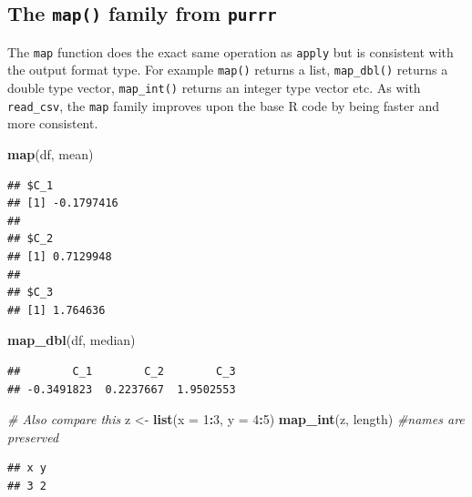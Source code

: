 \documentclass[12pt,]{article}
\newenvironment{Shaded}{\begin{snugshade}}{\end{snugshade}}
\newcommand{\KeywordTok}[1]{\textcolor[rgb]{0.13,0.29,0.53}{\textbf{#1}}}
\newcommand{\DataTypeTok}[1]{\textcolor[rgb]{0.13,0.29,0.53}{#1}}
\newcommand{\DecValTok}[1]{\textcolor[rgb]{0.00,0.00,0.81}{#1}}
\newcommand{\StringTok}[1]{\textcolor[rgb]{0.31,0.60,0.02}{#1}}
\newcommand{\CommentTok}[1]{\textcolor[rgb]{0.56,0.35,0.01}{\textit{#1}}}
\newcommand{\OperatorTok}[1]{\textcolor[rgb]{0.81,0.36,0.00}{\textbf{#1}}}
\newcommand{\NormalTok}[1]{#1}
\begin{document}
\subsection{\texorpdfstring{The \texttt{map()} family from
\texttt{purrr}}{The map() family from purrr}}\label{the-map-family-from-purrr}

The \texttt{map} function does the exact same operation as
\texttt{apply} but is consistent with the output format type. For
example \texttt{map()} returns a list, \texttt{map\_dbl()} returns a
double type vector, \texttt{map\_int()} returns an integer type vector
etc. As with \texttt{read\_csv}, the \texttt{map} family improves upon
the base R code by being faster and more consistent.

\begin{Shaded}
\begin{Highlighting}[]
\KeywordTok{map}\NormalTok{(df, mean)}
\end{Highlighting}
\end{Shaded}

\begin{verbatim}
## $C_1
## [1] -0.1797416
## 
## $C_2
## [1] 0.7129948
## 
## $C_3
## [1] 1.764636
\end{verbatim}

\begin{Shaded}
\begin{Highlighting}[]
\KeywordTok{map_dbl}\NormalTok{(df, median)}
\end{Highlighting}
\end{Shaded}

\begin{verbatim}
##        C_1        C_2        C_3 
## -0.3491823  0.2237667  1.9502553
\end{verbatim}

\begin{Shaded}
\begin{Highlighting}[]
\CommentTok{# Also compare this}
\NormalTok{z <-}\StringTok{ }\KeywordTok{list}\NormalTok{(}\DataTypeTok{x =} \DecValTok{1}\OperatorTok{:}\DecValTok{3}\NormalTok{, }\DataTypeTok{y =} \DecValTok{4}\OperatorTok{:}\DecValTok{5}\NormalTok{)}
\KeywordTok{map_int}\NormalTok{(z, length) }\CommentTok{#names are preserved}
\end{Highlighting}
\end{Shaded}

\begin{verbatim}
## x y 
## 3 2
\end{verbatim}
\end{document}
